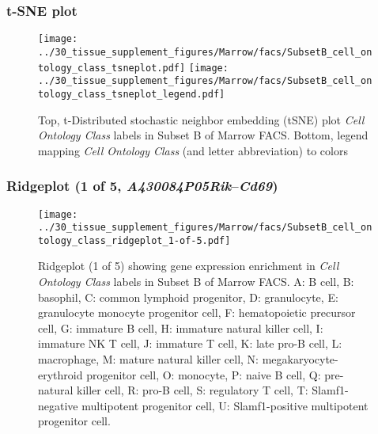 \clearpage
\subsubsection{t-SNE plot}
\begin{figure}[h]
\centering
\texttt{[image: ../30\_tissue\_supplement\_figures/Marrow/facs/SubsetB\_cell\_ontology\_class\_tsneplot.pdf]}
\texttt{[image: ../30\_tissue\_supplement\_figures/Marrow/facs/SubsetB\_cell\_ontology\_class\_tsneplot\_legend.pdf]}
\caption{Top, t-Distributed stochastic neighbor embedding (tSNE) plot  \emph{Cell Ontology Class} labels in Subset B of Marrow FACS. Bottom, legend mapping \emph{Cell Ontology Class} (and letter abbreviation) to colors}
\end{figure}


\clearpage

\subsubsection{Ridgeplot (1 of 5, \emph{A430084P05Rik}--\emph{Cd69})}
\begin{figure}[h]
\centering
\texttt{[image: ../30\_tissue\_supplement\_figures/Marrow/facs/SubsetB\_cell\_ontology\_class\_ridgeplot\_1-of-5.pdf]}

\caption{ Ridgeplot (1 of 5)  showing gene expression enrichment in \emph{Cell Ontology Class} labels in Subset B of Marrow FACS. A: B cell, B: basophil, C: common lymphoid progenitor, D: granulocyte, E: granulocyte monocyte progenitor cell, F: hematopoietic precursor cell, G: immature B cell, H: immature natural killer cell, I: immature NK T cell, J: immature T cell, K: late pro-B cell, L: macrophage, M: mature natural killer cell, N: megakaryocyte-erythroid progenitor cell, O: monocyte, P: naive B cell, Q: pre-natural killer cell, R: pro-B cell, S: regulatory T cell, T: Slamf1-negative multipotent progenitor cell, U: Slamf1-positive multipotent progenitor cell.}
\end{figure}


\clearpage

